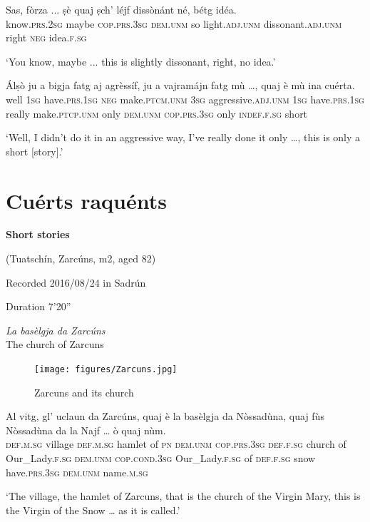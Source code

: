 \begin{linenumbers}
\gll  Sas, fòrza ... ṣè quaj ṣch’ léjf dissònánt né, bétg idéa.\\
 know.\textsc{prs.2sg} maybe {} \textsc{cop.prs.3sg} \textsc{dem.unm} so light.\textsc{adj.unm}  dissonant.\textsc{adj.unm} right \textsc{neg} idea.\textsc{f.sg}\\
\end{linenumbers}
\medskip
\glt `You know, maybe ... this is slightly dissonant, right, no idea.'
\medskip

\begin{linenumbers}
\gll  Álṣò ju a bigja fatg aj agrèssíf, ju a vajramájn fatg mù …, quaj è mù ina cuérta.  \\
well \textsc{1sg} have.\textsc{prs.1sg} \textsc{neg} make.\textsc{ptcm.unm} \textsc{3sg} aggressive.\textsc{adj.unm} \textsc{1sg} have.\textsc{prs.1sg} really make.\textsc{ptcp.unm} only {} \textsc{dem.unm} \textsc{cop.prs.3sg} only \textsc{indef.f.sg} short \\
\end{linenumbers}
\medskip
\glt `Well, I didn’t do it in an aggressive way, I’ve really done it only …, this is only a short [story].'
\medskip

\section{Cuérts raquénts}
\textbf{Short stories}

\noindent
(Tuatschín, Zarcúns, m2, aged 82)

\noindent
Recorded 2016/08/24 in Sadrún

\noindent
Duration 7'20''

\bigskip

\textit{La basèlgja da Zarcúns}\\
The church of Zarcuns\\
\medskip

\begin{figure}
	\texttt{[image: figures/Zarcuns.jpg]}
	\caption{Zarcuns and its church}
\end{figure}


\begin{linenumbers}
\gll Al vitg, gl’ uclaun da Zarcúns, quaj è la basèlgja da Nòssadùna, quaj fùs Nòssadùna da la Najf … ò quaj nùm.\\
 \textsc{def.m.sg} village \textsc{def.m.sg} hamlet of \textsc{pn} \textsc{dem.unm}  \textsc{cop.prs.3sg} \textsc{def.f.sg} church of Our\_Lady.\textsc{f.sg} \textsc{dem.unm} \textsc{cop.cond.3sg} Our\_Lady.\textsc{f.sg} of  \textsc{def.f.sg} snow {} have.\textsc{prs.3sg} \textsc{dem.unm} name.\textsc{m.sg} \\
\end{linenumbers}
\medskip
\glt `The village, the hamlet of Zarcuns, that is the church of the Virgin Mary, this is the Virgin of the Snow … as it is called.'
\medskip

